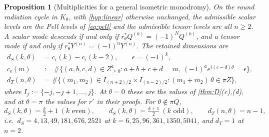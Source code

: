 \documentclass[11pt]{article}
\theoremstyle{canonmath}
\theoremstyle{canonpostulate}
\theoremstyle{canonproposition}
\theoremstyle{canonmath}
\newtheorem{proposition*}[theorem]{Proposition}
\theoremstyle{canonproposition}
\providecommand{\Klein}{\mathcal{K}}
\providecommand{\Z}{\mathbb{Z}}
\def\mathbb#1{#1}%
\def\mathcal#1{#1}%
\begin{document}
\begin{proposition*}[Multiplicities for a general isometric monodromy]\label{prop:moduli}
On the round radiation cycle in $\Klein_\theta$, with \ref{hyp:linear} otherwise unchanged, the admissible scalar levels are the Pell levels of \eqref{eq:pell} and the admissible tensor levels are all $n\ge2$. A scalar mode descends if and only if $r_\theta^*Q^{(k)} = (-1)^NQ^{(k)}$, and a tensor mode if and only if $r_\theta^*Y^{(n)} = (-1)^nY^{(n)}$. The retained dimensions are
\begin{align}
d_S(k,\theta) &= c_\epsilon(k) - c_\epsilon(k-2), \qquad \epsilon = (-1)^k,\\
c_\epsilon(m) &:= \#\bigl\{(a,b,c,d)\in\Z_{\ge0}^4 : a+b+c+d = m,\ (-1)^ae^{i(c-d)\theta} = \epsilon\bigr\},\nonumber\\
d_T(n,\theta) &= \#\bigl\{(m_1,m_2)\in I_{(n+2)/2}\times I_{(n-2)/2} : (m_1+m_2)\,\theta\in\pi\Z\bigr\},
\end{align}
where $I_j := \{-j,-j+1,\dots,j\}$.
At $\theta = 0$ these are the values of \cref{thm:D}(c),(d), and at $\theta = \pi$ the values for $r'$ in their proofs. For $\theta\notin\pi\mathbb{Q}$,
\[
d_S(k,\theta) = \tfrac k2+1\ (k\text{ even}), \qquad d_S(k,\theta) = \tfrac{k+1}2\ (k\text{ odd}), \qquad d_T(n,\theta) = n-1,
\]
i.e.\ $d_S = 4, 13, 49, 181, 676, 2521$ at $k = 6, 25, 96, 361, 1350, 5041$, and $d_T = 1$ at $n = 2$.
\end{proposition*}
\end{document}
